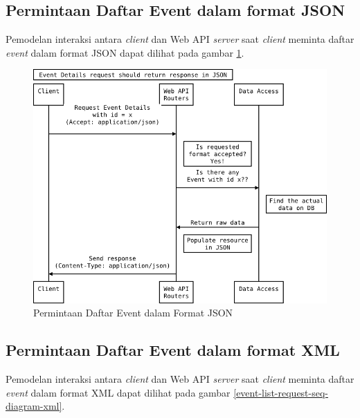 \documentclass[a4paper, 12pt, oneside]{report}
\begin{document}
\newpage

\subsection{Permintaan Daftar Event dalam format JSON}

\onehalfspacing Pemodelan interaksi antara \textit{client} dan Web API \textit{server} saat \textit{client} meminta daftar \textit{event} dalam format JSON dapat dilihat pada gambar \ref{event-list-request-seq-diagram-json}.

\begin{figure}[htp]
\centering
\includegraphics[scale=0.60]{images/event-details-request-seq-diagram-json.png}
\caption{Permintaan Daftar Event dalam Format JSON}
\label{event-list-request-seq-diagram-json}
\end{figure}

\newpage

\subsection{Permintaan Daftar Event dalam format XML}

\onehalfspacing Pemodelan interaksi antara \textit{client} dan Web API \textit{server} saat \textit{client} meminta daftar \textit{event} dalam format XML dapat dilihat pada gambar \ref{event-list-request-seq-diagram-xml}.
\end{document}
